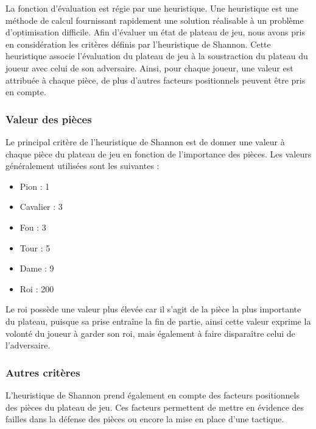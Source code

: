\huge\documentclass{article}
\begin{document}
La fonction d'évaluation est régie par une heuristique.
Une heuristique est une méthode de calcul fournissant rapidement une solution réalisable à un problème d'optimisation difficile.
\newline
Afin d'évaluer un état de plateau de jeu, nous avons pris en considération les critères définis par l'heuristique de Shannon\cite{Shannon_Heuristic}. Cette heuristique associe l'évaluation du plateau de jeu à la soustraction du plateau du joueur avec celui de son adversaire. Ainsi, pour chaque joueur, une valeur est attribuée à chaque pièce, de plus d'autres facteurs positionnels peuvent être pris en compte.
\subsubsection{Valeur des pièces}
Le principal critère de l'heuristique de Shannon est de donner une valeur à chaque pièce du plateau de jeu en fonction de l'importance des pièces. 
\newline
Les valeurs généralement utilisées sont les suivantes :
\begin{itemize}
    \item Pion : 1
    \item Cavalier : 3
    \item Fou : 3
    \item Tour : 5
    \item Dame : 9
    \item Roi : 200
\end{itemize}
Le roi possède une valeur plus élevée car il s'agit de la pièce la plus importante du plateau, puisque sa prise entraîne la fin de partie, ainsi cette valeur exprime la volonté du joueur à garder son roi, mais également à faire disparaître celui de l'adversaire.

\subsubsection{Autres critères} \label{criteres}
L'heuristique de Shannon prend également en compte des facteurs positionnels des pièces du plateau de jeu. Ces facteurs permettent de mettre en évidence des failles dans la défense des pièces ou encore la mise en place d'une tactique.
\newline
\end{document}
